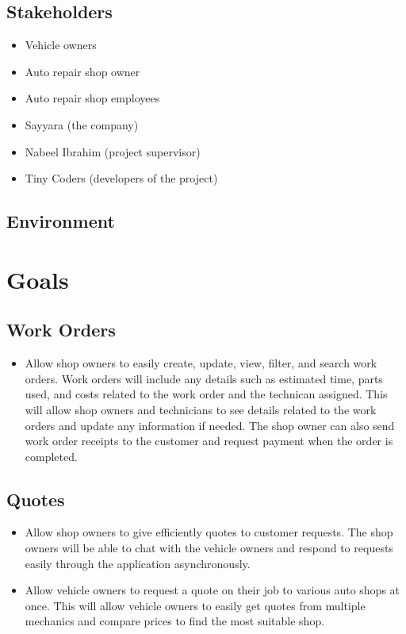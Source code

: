 \documentclass{article}
\begin{document}
\subsection{Stakeholders}
\begin{itemize}
    \item Vehicle owners
    \item Auto repair shop owner
    \item Auto repair shop employees
    \item Sayyara (the company)
    \item Nabeel Ibrahim (project supervisor)
    \item Tiny Coders (developers of the project)
\end{itemize}

\subsection{Environment}


\section{Goals}
\subsection{Work Orders}
\begin{itemize}
\item Allow shop owners to easily create, update, view, filter, and search work orders. Work orders will include any details such as estimated time, parts used, and costs related to the work order and the technican assigned. This will allow shop owners and technicians to see details related to the work orders and update any information if needed. The shop owner can also send work order receipts to the customer and request payment when the order is completed.
\end{itemize}

\subsection{Quotes}
\begin{itemize}
\item Allow shop owners to give efficiently quotes to customer requests. The shop owners will be able to chat with the vehicle owners and respond to requests easily through the application asynchronously.
\item Allow vehicle owners to request a quote on their job to various auto shops at once. This will allow vehicle owners to easily get quotes from multiple mechanics and compare prices to find the most suitable shop.
\end{itemize}
\end{document}
